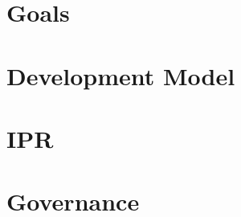 \documentclass[11pt]{article} %
\begin{document}
\section{Goals}

\section{Development Model}

\section{IPR}

\section{Governance}
\end{document}
